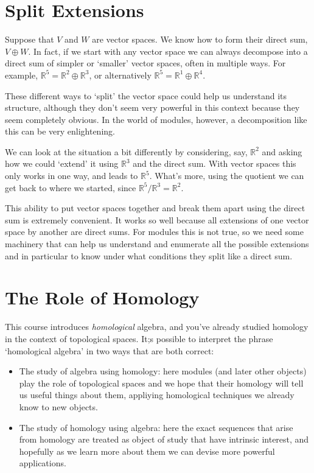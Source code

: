 \documentclass[oneside,english]{amsbook}
\numberwithin{section}{chapter}
\theoremstyle{plain}
\theoremstyle{definition}
\begin{document}
		\section{Split Extensions}
		
			Suppose that $V$ and $W$ are vector spaces. We know how to form their direct sum, $V\oplus W$. In fact, if we start with any vector space we can always decompose into a direct sum of simpler or `smaller' vector spaces, often in multiple ways. For example, $\mathbb{R}^5 = \mathbb{R}^2\oplus\mathbb{R}^3$, or alternatively $\mathbb{R}^5 = \mathbb{R}^1\oplus\mathbb{R}^4$. 
			
			These different ways to `split' the vector space could help us understand its structure, although they don't seem very powerful in this context because they seem completely obvious. In the world of modules, however, a decomposition like this can be very enlightening.
			
			We can look at the situation a bit differently by considering, say, $\mathbb{R}^2$ and asking how we could `extend' it using $\mathbb{R}^3$ and the direct sum. With vector spaces this only works in one way, and leads to $\mathbb{R}^5$.  What's more, using the quotient we can get back to where we started, since $\mathbb{R}^5/\mathbb{R}^3 = \mathbb{R}^2$.
			
			This ability to put vector spaces together and break them apart using the direct sum is extremely convenient. It works so well because all extensions of one vector space by another are direct sums. For modules this is not true, so we need some machinery that can help us understand and enumerate all the possible extensions and in particular to know under what conditions they split like a direct sum. 

		\section{The Role of Homology}
			
			This course introduces \emph{homological} algebra, and you've already studied homology in the context of topological spaces. It;s possible to interpret the phrase `homological algebra' in two ways that are both correct:
			
			\begin{itemize}
				\item The study of algebra using homology: here modules (and later other objects) play the role of topological spaces and we hope that their homology will tell us useful things about them, appliying homological techniques we already know to new objects.
				\item The study of homology using algebra: here the exact sequences that arise from homology are treated as object of study that have intrinsic interest, and hopefully as we learn more about them we can devise more powerful applications.
			\end{itemize}
			
\end{document}
